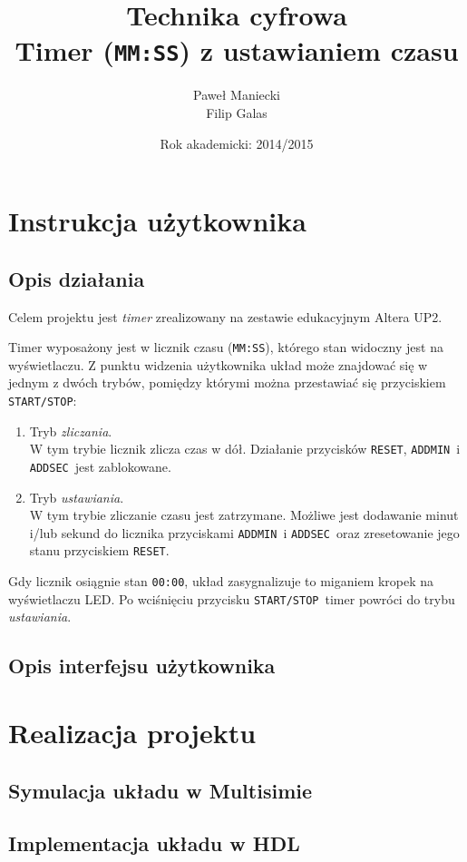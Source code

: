 \documentclass[a4paper,oneside]{report}
\title{
	\textbf{Technika cyfrowa}
	\\
	Timer (\texttt{MM:SS}) z ustawianiem czasu
	}
\author{
	Paweł Maniecki\\
	Filip Galas
	}
\date{Rok akademicki: 2014/2015}
\newcommand{\startstop}{\texttt{START/STOP}}
\newcommand{\reset}{\texttt{RESET}}
\newcommand{\addmin}{\texttt{ADD\textunderscore MIN}}
\newcommand{\addsec}{\texttt{ADD\textunderscore SEC}}
\begin{document}
\maketitle

\tableofcontents

\chapter{Instrukcja użytkownika}
\section{Opis działania}

Celem projektu jest \emph{timer} zrealizowany na zestawie
edukacyjnym Altera UP2.

Timer wyposażony jest w licznik czasu (\texttt{MM:SS}), którego
stan widoczny jest na wyświetlaczu. Z punktu widzenia użytkownika
układ może znajdować się w jednym z dwóch trybów, pomiędzy którymi
można przestawiać się przyciskiem \startstop :
\begin{enumerate}
\item Tryb \emph{zliczania}.\\
W tym trybie licznik zlicza czas w dół. Działanie przycisków
\reset , \addmin\ i \addsec\ jest zablokowane.
\item Tryb \emph{ustawiania}.\\
W tym trybie zliczanie czasu jest zatrzymane. Możliwe jest
dodawanie minut i/lub sekund do licznika przyciskami \addmin\ i
\addsec\ oraz zresetowanie jego stanu przyciskiem \reset .
\end{enumerate}
Gdy licznik osiągnie stan \texttt{00:00}, układ zasygnalizuje to
miganiem kropek na wyświetlaczu LED. Po wciśnięciu przycisku
\startstop\ timer powróci do trybu \emph{ustawiania}.
\section{Opis interfejsu użytkownika}

\chapter{Realizacja projektu}
\section{Symulacja układu w Multisimie}
\section{Implementacja układu w HDL}
\end{document}
